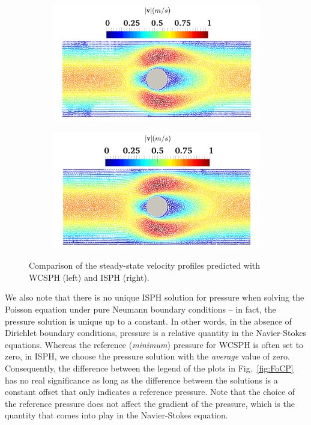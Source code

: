 \begin{figure}
	\centering    
	\begin{subfigure}{0.47\columnwidth}    
		\centering
		\includegraphics[width=1.0\textwidth]{images/SPH_Comparison/v_xsph.png}
	\end{subfigure}
	\begin{subfigure}{0.47\columnwidth}
		\centering
		\includegraphics[width=1.0\textwidth]{images/SPH_Comparison/v_isph.png}
	\end{subfigure}
	\caption{Comparison of the steady-state velocity profiles predicted with WCSPH (left) and ISPH (right).}    \label{fig:FoCV}
\end{figure} 


We also note that there is no unique ISPH solution for pressure when solving the Poisson equation under pure Neumann boundary conditions -- in fact, the pressure solution is unique up to a constant. In other words, in the absence of Dirichlet boundary conditions, pressure is a relative quantity in the Navier-Stokes equations. Whereas the reference (\textit{minimum}) pressure for WCSPH is often set to zero, in ISPH, we choose the pressure solution with the \textit{average} value of zero.
Consequently, the difference between the legend of the plots in Fig.~\ref{fig:FoCP} has no real significance as long as the difference between the solutions is a constant offset that only indicates a reference pressure. Note that the choice of the reference pressure does not affect the gradient of the pressure, which is the quantity that comes into play in the Navier-Stokes equation.

